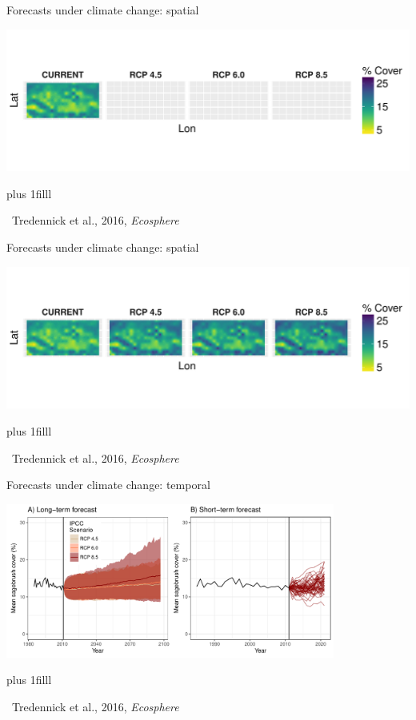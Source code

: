 \documentclass[14pt, compress, aspectratio=1610]{beamer}
\newcommand{\btVFill}{\vskip0pt plus 1filll}
\newcommand{\credit}[1]{\btVFill\par\hfill \footnotesize ~#1}
\begin{document}
\begin{frame}{%
\protect\hypertarget{forecasts-under-climate-change-spatial}{%
Forecasts under climate change: spatial}}

\includegraphics[width=\textwidth]{./figures/clim_change_mean_spatial_empty.pdf}

\credit{Tredennick et al., 2016, \emph{Ecosphere}}

\end{frame}

\begin{frame}{%
\protect\hypertarget{forecasts-under-climate-change-spatial-1}{%
Forecasts under climate change: spatial}}

\includegraphics[width=\textwidth]{./figures/clim_change_mean_spatial.pdf}

\credit{Tredennick et al., 2016, \emph{Ecosphere}}

\end{frame}

\begin{frame}{%
\protect\hypertarget{forecasts-under-climate-change-temporal}{%
Forecasts under climate change: temporal}}

\centering

\includegraphics[height=2in]{./figures/temporal_forecasts_presentation.pdf}

\credit{Tredennick et al., 2016, \emph{Ecosphere}}

\end{frame}
\end{document}
